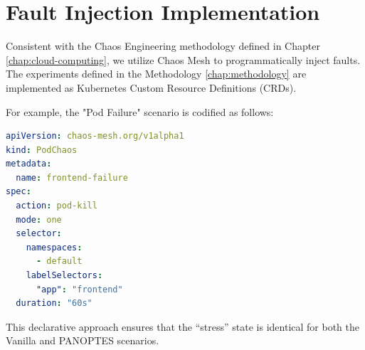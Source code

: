 \section{Fault Injection Implementation}
\label{sec:fault-injection-impl}

Consistent with the Chaos Engineering methodology defined in Chapter \ref{chap:cloud-computing}, we utilize Chaos Mesh to programmatically inject faults. The experiments defined in the Methodology \ref{chap:methodology} are implemented as Kubernetes Custom Resource Definitions (CRDs).

For example, the "Pod Failure" scenario is codified as follows:

\begin{lstlisting}[language=Yaml, caption={Pod Chaos Manifest}, label={code:pod-chaos}]
apiVersion: chaos-mesh.org/v1alpha1
kind: PodChaos
metadata:
  name: frontend-failure
spec:
  action: pod-kill
  mode: one
  selector:
    namespaces:
      - default
    labelSelectors:
      "app": "frontend"
  duration: "60s"
\end{lstlisting}

This declarative approach ensures that the ``stress'' state is identical for both the Vanilla and PANOPTES scenarios.